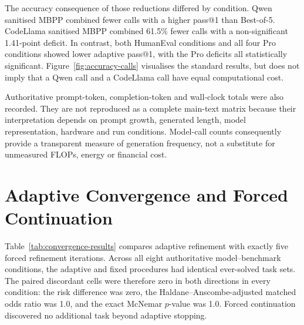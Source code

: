 The accuracy consequence of those reductions differed by condition. Qwen sanitised MBPP combined fewer calls with a higher pass@1 than Best-of-5. CodeLlama sanitised MBPP combined 61.5\% fewer calls with a non-significant 1.41-point deficit. In contrast, both HumanEval conditions and all four Pro conditions showed lower adaptive pass@1, with the Pro deficits all statistically significant. Figure~\ref{fig:accuracy-calls} visualises the standard results, but does not imply that a Qwen call and a CodeLlama call have equal computational cost.

Authoritative prompt-token, completion-token and wall-clock totals were also recorded. They are not reproduced as a complete main-text matrix because their interpretation depends on prompt growth, generated length, model representation, hardware and run conditions. Model-call counts consequently provide a transparent measure of generation frequency, not a substitute for unmeasured FLOPs, energy or financial cost.

\section{Adaptive Convergence and Forced Continuation}

Table~\ref{tab:convergence-results} compares adaptive refinement with exactly five forced refinement iterations. Across all eight authoritative model--benchmark conditions, the adaptive and fixed procedures had identical ever-solved task sets. The paired discordant cells were therefore zero in both directions in every condition: the risk difference was zero, the Haldane--Anscombe-adjusted matched odds ratio was 1.0, and the exact McNemar $p$-value was 1.0. Forced continuation discovered no additional task beyond adaptive stopping.

